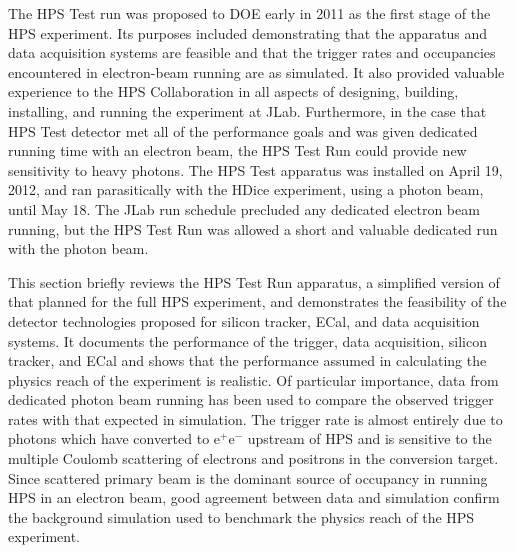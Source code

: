 The HPS Test run was proposed to DOE early in 2011 as the first stage of the HPS experiment. Its
purposes included demonstrating that the apparatus and data acquisition systems are feasible and
that the trigger rates and occupancies encountered in electron-beam running are as simulated.  It also
provided valuable experience to the HPS Collaboration in all aspects of designing, building, installing,
and running the experiment at JLab. Furthermore, in the case that HPS Test detector met all of the 
performance goals and was given dedicated running time with an electron beam, the HPS Test Run 
could provide new sensitivity to heavy photons. The HPS Test apparatus was installed on April 19, 2012, and 
ran parasitically with the HDice experiment, using a photon beam, until May 18. The JLab run schedule 
precluded any dedicated electron beam running, but the HPS Test Run was allowed a short and valuable
dedicated run with the photon beam.

This section briefly reviews the HPS Test Run apparatus, a simplified version of that 
planned for the full HPS experiment, and demonstrates the feasibility of the detector
technologies proposed for silicon tracker, ECal, and data acquisition systems. It documents the
performance of the trigger, data acquisition, silicon tracker, and ECal
and shows that the performance assumed in calculating the physics reach of the experiment is realistic.
Of particular importance, data from dedicated photon beam running has been used to compare
the observed trigger rates with that expected in simulation. The trigger rate is almost entirely due to
photons which have converted to e$^+$e$^-$ upstream of HPS and is sensitive to the multiple
Coulomb scattering of electrons and positrons in the conversion target.  Since scattered primary beam is the dominant 
source of occupancy in running HPS in an electron beam, good agreement between data and simulation 
confirm the background simulation used to benchmark the physics reach of the HPS experiment. 

